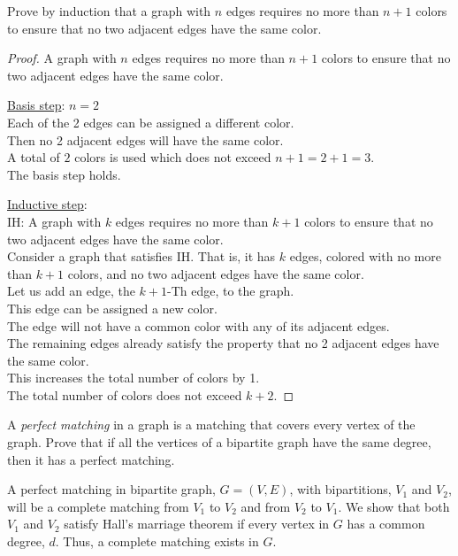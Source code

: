 \documentclass[a4paper]{exam}
\begin{document}
\begin{questions}
  \question Prove by induction that a graph with $n$ edges requires no more than $n+1$ colors to ensure that no two adjacent edges have the same color.
  \begin{solution}
    \begin{proof} A graph with $n$ edges requires no more than $n+1$ colors to ensure that no two adjacent edges have the same color.

      \underline{Basis step}: $n=2$\\
      Each of the 2 edges can be assigned a different color.\\
      Then no 2 adjacent edges will have the same color.\\
      A total of $2$ colors is used which does not exceed $n+1=2+1=3$.\\
      The basis step holds.

      \underline{Inductive step}: \\
      IH: A graph with $k$ edges requires no more than $k+1$ colors to ensure that no two adjacent edges have the same color.\\
      Consider a graph that satisfies IH. That is, it has $k$ edges, colored with no more than $k+1$ colors, and no two adjacent edges have the same color.\\
      Let us add an edge, the $k+1$-Th edge, to the graph.\\
      This edge can be assigned a new color.\\
      The edge will not have a common color with any of its adjacent edges.\\
      The remaining edges already satisfy the property that no 2 adjacent edges have the same color.\\
      This increases the total number of colors by 1.\\
      The total number of colors does not exceed $k+2$.
    \end{proof}
  \end{solution}
  
  \question A \textit{perfect matching} in a graph is a matching that covers every vertex of the graph. Prove that if all the vertices of a bipartite graph have the same degree, then it has a perfect matching.
  \begin{solution}
    A perfect matching in bipartite graph, $G=(V,E)$, with bipartitions, $V_1$ and $V_2$, will be a complete matching from $V_1$ to $V_2$ and from $V_2$ to $V_1$. We show that both $V_1$ and $V_2$ satisfy Hall's marriage theorem if every vertex in $G$ has a common degree, $d$. Thus, a complete matching exists in $G$.


\end{solution}
\end{questions}
\end{document}
